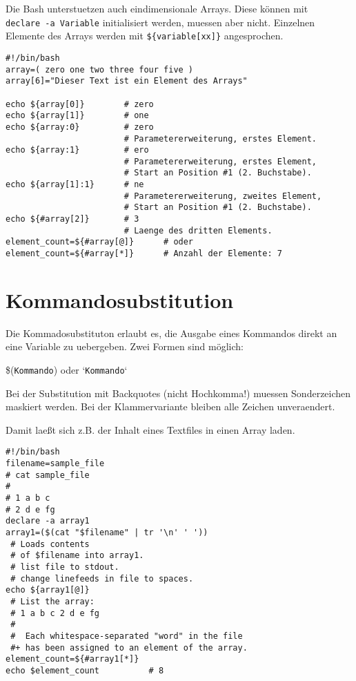 \documentclass[12pt,]{article}
\begin{document}
Die Bash unterstuetzen auch eindimensionale Arrays. Diese können mit
\texttt{declare\ -a\ Variable} initialisiert werden, muessen aber nicht.
Einzelnen Elemente des Arrays werden mit \texttt{\$\{variable{[}xx{]}\}}
angesprochen.

\begin{verbatim}
#!/bin/bash
array=( zero one two three four five )
array[6]="Dieser Text ist ein Element des Arrays"

echo ${array[0]}        # zero
echo ${array[1]}        # one
echo ${array:0}         # zero
                        # Parametererweiterung, erstes Element.
echo ${array:1}         # ero
                        # Parametererweiterung, erstes Element,
                        # Start an Position #1 (2. Buchstabe).
echo ${array[1]:1}      # ne
                        # Parametererweiterung, zweites Element,
                        # Start an Position #1 (2. Buchstabe).
echo ${#array[2]}       # 3
                        # Laenge des dritten Elements.
element_count=${#array[@]}      # oder
element_count=${#array[*]}      # Anzahl der Elemente: 7
\end{verbatim}

\section{Kommandosubstitution}\label{kommandosubstitution}

Die Kommadosubstituton erlaubt es, die Ausgabe eines Kommandos direkt an
eine Variable zu uebergeben. Zwei Formen sind möglich:

\$(\texttt{Kommando}) oder `\texttt{Kommando}`

Bei der Substitution mit Backquotes (nicht Hochkomma!) muessen
Sonderzeichen maskiert werden. Bei der Klammervariante bleiben alle
Zeichen unveraendert.

Damit laeßt sich z.B. der Inhalt eines Textfiles in einen Array laden.

\begin{verbatim}
#!/bin/bash
filename=sample_file
# cat sample_file
#
# 1 a b c
# 2 d e fg
declare -a array1
array1=($(cat "$filename" | tr '\n' ' '))
 # Loads contents
 # of $filename into array1.
 # list file to stdout.
 # change linefeeds in file to spaces.
echo ${array1[@]}
 # List the array:
 # 1 a b c 2 d e fg
 #
 #  Each whitespace-separated "word" in the file
 #+ has been assigned to an element of the array.
element_count=${#array1[*]}
echo $element_count          # 8
\end{verbatim}
\end{document}
